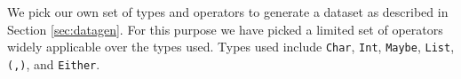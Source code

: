 \documentclass{article} %
\begin{document}
We pick our own set of types and operators to generate a dataset as described in Section \ref{sec:datagen}.
For this purpose we have picked a limited set of operators widely applicable over the types used.
Types used include \verb|Char|, \verb|Int|, \verb|Maybe|, \verb|List|, \verb|(,)|, and \verb|Either|.

\end{document}
